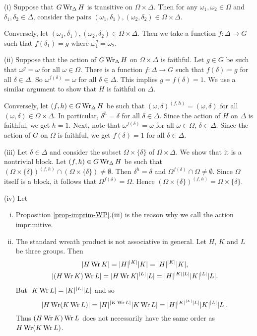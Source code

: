 \begin{sketch}
	(i) Suppose that $G\operatorname{Wr}_\Delta H$ is transitive on $\Omega\times \Delta$. Then for any $\omega_1,\omega_2\in \Omega$ and $\delta_1,\delta_2\in \Delta$, consider the pairs $(\omega_1,\delta_1),(\omega_2,\delta_2) \in \Omega\times\Delta$. 
	
	Conversely, let $(\omega_1,\delta_1),(\omega_2,\delta_2) \in \Omega\times\Delta$. Then we take a function $f:\Delta \to G$ such that $f(\delta_1)=g$ where $\omega_1^g =\omega_2$.
	
	(ii) Suppose that the action of $G\operatorname{Wr}_\Delta H$ on $\Omega\times \Delta$ is faithful. Let $g\in G$ be such that $\omega^g = \omega$ for all $\omega\in \Omega$. There is a function $f:\Delta\to G$ such that $f(\delta) = g$ for all $\delta\in \Delta$. So $\omega^{f(\delta)} = \omega$ for all $\delta\in \Delta$. This implies $g = f(\delta) = 1$. We use a similar argument to show that $H$ is faithful on $\Delta$.
	
	Conversely, let $(f,h)\in G\operatorname{Wr}_{\Delta} H$ be such that  $(\omega,\delta)^{(f,h)} = (\omega,\delta)$ for all $(\omega,\delta)\in\Omega\times \Delta$. In particular, $\delta^h = \delta$ for all $\delta\in \Delta$. Since the action of $H$ on $\Delta$ is faithful, we get $h = 1$. Next, note that $\omega^{f(\delta)} = \omega$ for all $\omega\in\Omega$, $\delta\in\Delta$. Since the action of $G$ on $\Omega$ is faithful, we get $f(\delta) = 1$ for all $\delta\in\Delta$.
	
	(iii) Let $\delta\in \Delta$ and consider the subset $\Omega\times \{\delta\}$ of $\Omega\times \Delta$. We show that it is a nontrivial block. Let $(f,h)\in G\operatorname{Wr}_{\Delta} H$ be  such that $(\Omega\times \{\delta\})^{(f,h)} \cap (\Omega\times \{\delta\}) \neq \emptyset$. Then $\delta^h = \delta$ and $\Omega^{f(\delta)} \cap \Omega \neq \emptyset$. Since $\Omega$ itself is a block, it follows that $\Omega^{f(\delta)} =\Omega$. Hence $(\Omega\times \{\delta\})^{(f,h)} = \Omega\times \{\delta\}$.
	
	(iv) Let 
\end{sketch}

\begin{remark}\begin{enumerate}[(i)]
		\item 	Proposition \ref{prop-imprim-WP}.(iii) is the reason why we call the action imprimitive.
		\item The standard wreath product is not associative in general. Let $H$, $K$ and $L$ be three groups. Then
\begin{gather*}
	|H \operatorname{Wr} K| = |H|^{|K|} |K| = |H|^{|K|} |K|,
	\\
	|(H \operatorname{Wr} K) \operatorname{Wr} L| = |H \operatorname{Wr} K|^{|L|} |L| = |H|^{|K||L|} |K|^{|L|} |L|.
\end{gather*}  But $|K \operatorname{Wr} L| = |K|^{|L|} |L|$ and so $$|H \operatorname{Wr} (K \operatorname{Wr} L)| = |H|^{|K \operatorname{Wr} L|} |K \operatorname{Wr} L| = |H|^{|K|^{|L|} |L|} |K|^{|L|} |L|.$$
 Thus $(H \operatorname{Wr} K) \operatorname{Wr} L$ does not necessarily have the same order  as $H \operatorname{Wr} (K \operatorname{Wr} L)$. 
	\end{enumerate}

\end{remark}

